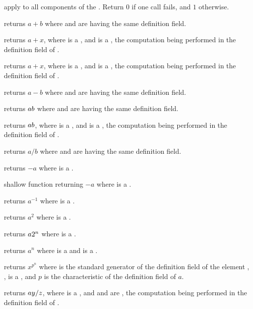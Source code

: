  apply  to all components
of the . Return $0$ if one call fails, and $1$ otherwise.

 returns $a+b$ where  and  are
 having the same definition field.

 returns $a+x$, where  is a
, and  is a , the computation being
performed in the definition field of .

 returns $a+x$, where  is a
, and  is a , the computation being
performed in the definition field of .

 returns $a-b$ where  and  are
 having the same definition field.

 returns $a\*b$ where  and  are
 having the same definition field.

 returns $a\*b$, where  is a
, and  is a , the computation being
performed in the definition field of .

 returns $a/b$ where  and  are
 having the same definition field.

 returns $-a$ where  is a .

 shallow function returning $-a$ where  is a
.

 returns $a^{-1}$ where  is a .

 returns $a^2$ where  is a .

 returns $a\*2^n$ where  is a
.

 returns $a^n$ where  is a 
and  is a .

 returns $x^{p^n}$ where  is
the standard generator of the definition field of the  element
, ,  is a , and $p$ is the characteristic
of the definition field of $a$.

 returns $a\*y/z$, where 
is a , and  and  are , the computation being
performed in the definition field of .

